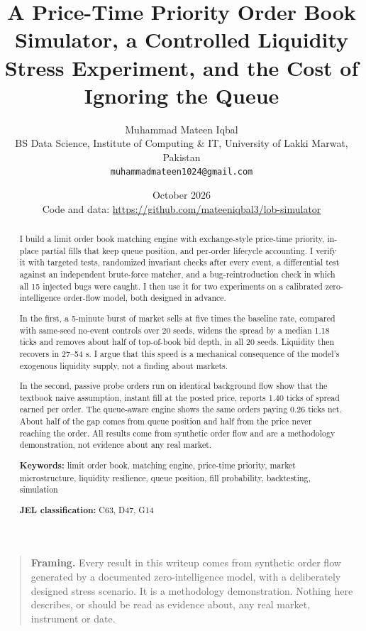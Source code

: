 \documentclass[11pt]{article}
\title{A Price-Time Priority Order Book Simulator, a Controlled Liquidity Stress Experiment, and the Cost of Ignoring the Queue}
\author{Muhammad Mateen Iqbal\\[2pt]
  {\normalsize BS Data Science, Institute of Computing \& IT, University of Lakki Marwat, Pakistan}\\
  {\normalsize\texttt{muhammadmateen1024@gmail.com}}}
\date{October 2026\\[2pt] {\small Code and data: \url{https://github.com/mateeniqbal3/lob-simulator}}}
\begin{document}
\maketitle
\thispagestyle{empty}

\begin{abstract}
I build a limit order book matching engine with exchange-style
price-time priority, in-place partial fills that keep queue position,
and per-order lifecycle accounting. I verify it with targeted tests,
randomized invariant checks after every event, a differential test
against an independent brute-force matcher, and a bug-reintroduction
check in which all 15 injected bugs were caught. I then use it for two
experiments on a calibrated zero-intelligence order-flow model, both
designed in advance.

In the first, a 5-minute burst of market sells at five times the
baseline rate, compared with same-seed no-event controls over 20 seeds,
widens the spread by a median 1.18 ticks and removes about half of
top-of-book bid depth, in all 20 seeds. Liquidity then recovers in
27--54 s. I argue that this speed is a mechanical consequence of the
model's exogenous liquidity supply, not a finding about markets.

In the second, passive probe orders run on identical background flow
show that the textbook naive assumption, instant fill at the posted
price, reports 1.40 ticks of spread earned per order. The queue-aware
engine shows the same orders paying 0.26 ticks net. About half of the
gap comes from queue position and half from the price never reaching the
order. All results come from synthetic order flow and are a methodology
demonstration, not evidence about any real market.

\medskip
\noindent \textbf{Keywords:} limit order book, matching engine, price-time priority,
market microstructure, liquidity resilience, queue position, fill
probability, backtesting, simulation

\noindent \textbf{JEL classification:} C63, D47, G14
\end{abstract}

\begin{quote}
\textbf{Framing.} Every result in this writeup comes from synthetic order
flow generated by a documented zero-intelligence model, with a
deliberately designed stress scenario. It is a methodology
demonstration. Nothing here describes, or should be read as evidence
about, any real market, instrument or date.
\end{quote}
\end{document}

